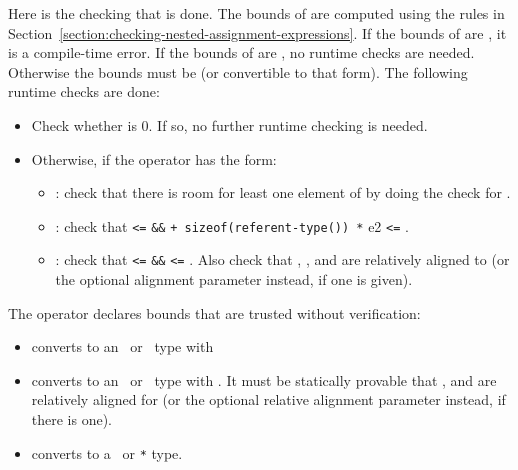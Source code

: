 Here is the checking that is done. The bounds of  are computed
using the rules in Section~\ref{section:checking-nested-assignment-expressions}.
If the bounds of  are \boundsnone, it is a compile-time error. 
If the bounds of  are \boundsany, no runtime checks are needed.
Otherwise the bounds must be  (or convertible to that form).
The following runtime checks are done:
\begin{itemize}
\item Check whether  is 0.  If so, no further runtime checking
is needed.
\item Otherwise, if the operator has the form:
\begin{itemize}
\item
  :
  check that there is room for least one element of  by doing
  the check for .
\item
  :
   check that 
  \texttt{<=}  \texttt{\&\&}  \texttt{+
  sizeof(referent-type(}\texttt{)) *} e2 \texttt{<=}
  .
\item
  : 
  check that  \texttt{<=}  \texttt{\&\&}
   \texttt{<=} . Also check that , , and  
  are relatively aligned to  (or the optional alignment parameter instead, if one
  is given). 

\end{itemize}
\end{itemize}

The operator  declares bounds that are trusted
without verification:
\begin{itemize}
\item
  converts  to an \arrayptr\ or
  \spanptr\ type with 
\item
  converts  to an
  \arrayptr\ or \spanptr\ type with .
  It must be statically provable that ,  and 
  are relatively aligned for  (or the optional
  relative alignment parameter instead, if there is one).
\item
  converts  to a \ptr\ or \texttt{*} type.
\end{itemize}

